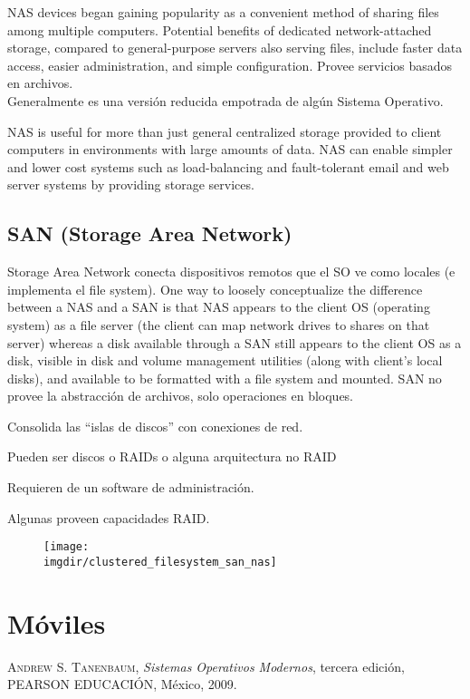 \documentclass[a4paper, twoside]{article}
\newcommand{\imgdir}{../resources/images} %
\begin{document}
NAS devices began gaining popularity as a convenient method of sharing files among multiple computers. Potential benefits of dedicated network-attached storage, compared to general-purpose servers also serving files, include faster data access, easier administration, and simple configuration. Provee servicios basados en archivos.\\

Generalmente es una versión reducida empotrada de algún Sistema Operativo.

NAS is useful for more than just general centralized storage provided to client computers in environments with large amounts of data. NAS can enable simpler and lower cost systems such as load-balancing and fault-tolerant email and web server systems by providing storage services.

\subsection{SAN (Storage Area Network)}
Storage Area Network conecta dispositivos remotos que el SO ve como locales (e implementa el file system).
One way to loosely conceptualize the difference between a NAS and a SAN is that NAS appears to the client OS (operating system) as a file server (the client can map network drives to shares on that server) whereas a disk available through a SAN still appears to the client OS as a disk, visible in disk and volume management utilities (along with client's local disks), and available to be formatted with a file system and mounted. SAN no provee la abstracción de archivos, solo operaciones en bloques.

Consolida las ``islas de discos'' con conexiones de red.

Pueden ser discos o RAIDs o alguna arquitectura no RAID

Requieren de un software de administración.

Algunas proveen capacidades RAID.

\begin{figure}[H]
	\centering
	\texttt{[image: \\imgdir/clustered\_filesystem\_san\_nas]}
	\label{fig:clustered_filesystem_san_nas}
\end{figure}

\newpage
\section{Móviles}

\newpage
\newcommand{\bibliographyname}{Bibliografía} %
\addcontentsline{toc}{section}{\bibliographyname} %
\renewcommand\refname{\bibliographyname} %
\begin{thebibliography}{X}
	 \textsc{Andrew S. Tanenbaum}, \textit{Sistemas Operativos Modernos}, tercera edición, PEARSON EDUCACIÓN, México, 2009.
\end{thebibliography}
\end{document}

